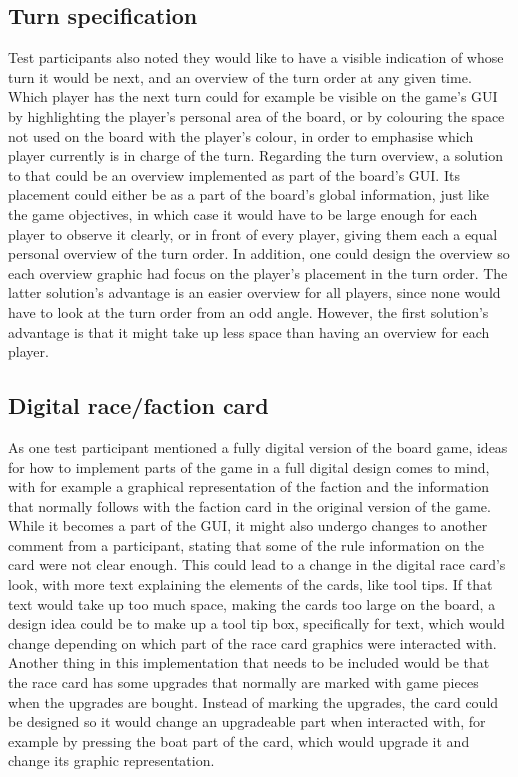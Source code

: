 \subsection{Turn specification}
Test participants also noted they would like to have a visible indication of whose turn it would be next, and an overview of the turn order at any given time. Which player has the next turn could for example be visible on the game's GUI by highlighting the player's personal area of the board, or by colouring the space not used on the board with the player's colour, in order to emphasise which player currently is in charge of the turn.
Regarding the turn overview, a solution to that could be an overview implemented as part of the board's GUI. Its placement could either be as a part of the board's global information, just like the game objectives, in which case it would have to be large enough for each player to observe it clearly, or in front of every player, giving them each a equal personal overview of the turn order. In addition, one could design the overview so each overview graphic had focus on the player's placement in the turn order. The latter solution's advantage is an easier overview for all players, since none would have to look at the turn order from an odd angle. However, the first solution's advantage is that it might take up less space than having an overview for each player.

\subsection{Digital race/faction card}\label{sec:DigiRaceFact}
As one test participant mentioned a fully digital version of the board game, ideas for how to implement parts of the game in a full digital design comes to mind, with for example a graphical representation of the faction and the information that normally follows with the faction card in the original version of the game. While it becomes a part of the GUI, it might also undergo changes to another comment from a participant, stating that some of the rule information on the card were not clear enough. This could lead to a change in the digital race card's look, with more text explaining the elements of the cards, like tool tips. If that text would take up too much space, making the cards too large on the board, a design idea could be to make up a tool tip box, specifically for text, which would change depending on which part of the race card graphics were interacted with. Another thing in this implementation that needs to be included would be that the race card has some upgrades that normally are marked with game pieces when the upgrades are bought. Instead of marking the upgrades, the card could be designed so it would change an upgradeable part when interacted with, for example by pressing the boat part of the card, which would upgrade it and change its graphic representation.

